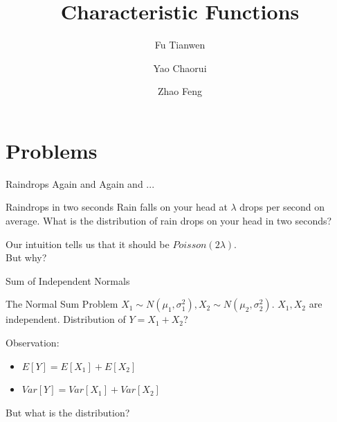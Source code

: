\documentclass{beamer}
\title{Characteristic Functions}
\author[Fu\and Yao\and Zhao]{Fu Tianwen \and Yao Chaorui \and Zhao Feng}
\institute[CUHK]{the Chinese University of Hong Kong}
\begin{document}
\begin{frame}
	\titlepage
\end{frame}
\section{Problems}
\begin{frame}{Raindrops Again and Again and ...}
	\begin{block}{Raindrops in two seconds}
		Rain falls on your head at $\lambda$ drops per second on average. What is the distribution of rain drops on your head in two seconds?\pause
	\end{block}
	Our intuition tells us that it should be $Poisson(2\lambda)$.\pause\\
	But why?
\end{frame}
\begin{frame}{Sum of Independent Normals}
	\begin{block}{The Normal Sum Problem}
		$X_1\sim N(\mu_1,\sigma_1^2), X_2\sim N(\mu_2,\sigma_2^2).$ $X_1,X_2$ are independent. Distribution of $Y=X_1+X_2$?\pause
	\end{block}
	Observation:
	\begin{itemize}
		\item $E[Y] = E[X_1]+E[X_2]$ 
		\item $Var[Y] = Var[X_1]+Var[X_2]$ \pause
	\end{itemize}
	But what is the distribution?
\end{frame}
\end{document}
